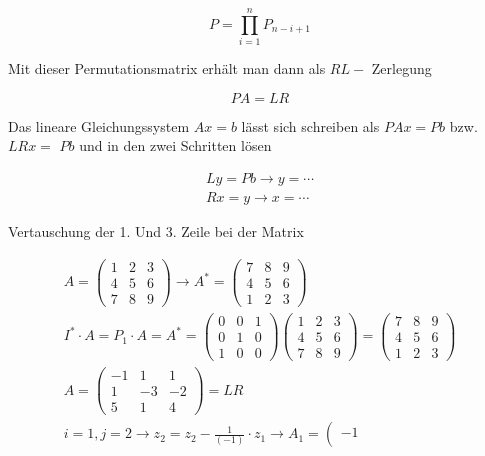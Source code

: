 $$
P=\prod_{i=1}^{n} P_{n-i+1}
$$

Mit dieser Permutationsmatrix erhält man dann als $R L-$ Zerlegung

$$
P A=L R
$$

Das lineare Gleichungssystem $A x=b$ lässt sich schreiben als $P A x=P b$ bzw. $L R x=$ $P b$ und in den zwei Schritten lösen

$$
\begin{gathered}
L y=P b \rightarrow y=\cdots \\
R x=y \rightarrow x=\cdots
\end{gathered}
$$

Vertauschung der 1. Und 3. Zeile bei der Matrix

$$
\begin{gathered}
A=\left(\begin{array}{lll}
1 & 2 & 3 \\
4 & 5 & 6 \\
7 & 8 & 9
\end{array}\right) \rightarrow A^{*}=\left(\begin{array}{lll}
7 & 8 & 9 \\
4 & 5 & 6 \\
1 & 2 & 3
\end{array}\right) \\
I^{*} \cdot A=P_{1} \cdot A=A^{*}=\left(\begin{array}{lll}
0 & 0 & 1 \\
0 & 1 & 0 \\
1 & 0 & 0
\end{array}\right)\left(\begin{array}{lll}
1 & 2 & 3 \\
4 & 5 & 6 \\
7 & 8 & 9
\end{array}\right)=\left(\begin{array}{lll}
7 & 8 & 9 \\
4 & 5 & 6 \\
1 & 2 & 3
\end{array}\right) \\
A=\left(\begin{array}{ccc}
-1 & 1 & 1 \\
1 & -3 & -2 \\
5 & 1 & 4
\end{array}\right)=L R \\
i=1, j=2 \rightarrow z_{2}=z_{2}-\frac{1}{(-1)} \cdot z_{1} \rightarrow A_{1}=\left(\begin{array}{ccc}
-1 \\

\end{array}
\end{gathered}$$
